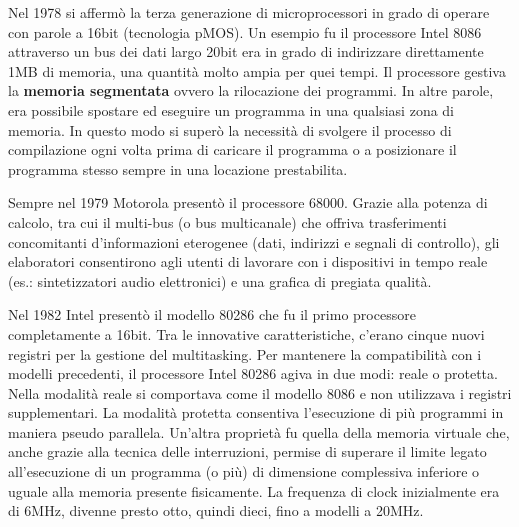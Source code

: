 \documentclass[12pt]{article}
\begin{document}
Nel 1978 si affermò la terza generazione di microprocessori in grado di operare con parole a 16bit (tecnologia pMOS). Un esempio fu il processore Intel 8086 attraverso un bus dei dati largo 20bit era in grado di indirizzare direttamente 1MB di memoria, una quantità molto ampia per quei tempi. Il processore gestiva la \textbf{memoria segmentata} ovvero la rilocazione dei programmi. In altre parole, era possibile spostare ed eseguire un programma in una qualsiasi zona di memoria. In questo modo si superò la necessità di svolgere il processo di compilazione ogni volta prima di caricare il programma o a posizionare il programma stesso sempre in una locazione prestabilita.\par\medskip\noindent
Sempre nel 1979 Motorola presentò il processore 68000. Grazie alla potenza di calcolo, tra cui il multi-bus (o bus multicanale) che offriva trasferimenti concomitanti d’informazioni eterogenee (dati, indirizzi e segnali di controllo), gli elaboratori consentirono agli utenti di lavorare con i dispositivi in tempo reale (es.: sintetizzatori audio elettronici) e una grafica di pregiata qualità.\par\medskip\noindent
Nel 1982 Intel presentò il modello 80286 che fu il primo processore completamente a 16bit. Tra le innovative caratteristiche, c’erano cinque nuovi registri per la gestione del multitasking. Per mantenere la compatibilità con i modelli precedenti, il processore Intel 80286 agiva in due modi: reale o protetta. Nella modalità reale si comportava come il modello 8086 e non utilizzava i registri supplementari. La modalità protetta consentiva l’esecuzione di più programmi in maniera pseudo parallela. Un’altra proprietà fu quella della memoria virtuale che, anche grazie alla tecnica delle interruzioni, permise di superare il limite legato all’esecuzione di un programma (o più) di dimensione complessiva inferiore o uguale alla memoria presente fisicamente. La frequenza di clock inizialmente era di 6MHz, divenne presto otto, quindi dieci, fino a modelli a 20MHz.
\end{document}
